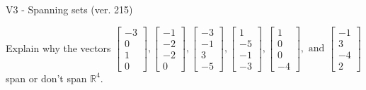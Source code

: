 \begin{exercise}
  \begin{exerciseTitle}V3 - Spanning sets (ver. 215)\end{exerciseTitle}
  \begin{exerciseStatement}
    Explain why the vectors \(\left[\begin{array}{r}
-3 \\
0 \\
1 \\
0
\end{array}\right] , \left[\begin{array}{r}
-1 \\
-2 \\
-2 \\
0
\end{array}\right] , \left[\begin{array}{r}
-3 \\
-1 \\
3 \\
-5
\end{array}\right] , \left[\begin{array}{r}
1 \\
-5 \\
-1 \\
-3
\end{array}\right] , \left[\begin{array}{r}
1 \\
0 \\
0 \\
-4
\end{array}\right] , \text{ and } \left[\begin{array}{r}
-1 \\
3 \\
-4 \\
2
\end{array}\right]\) span or don't span \(\mathbb{R}^4\). 
	



\end{exerciseStatement}
\end{exercise}
